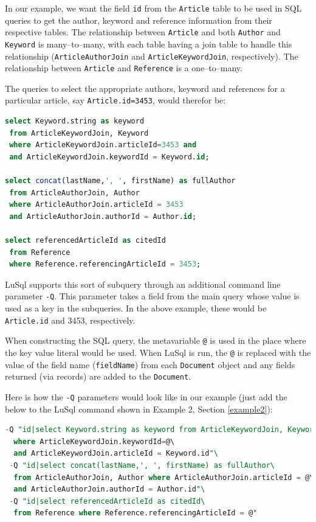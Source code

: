 In our example, we want the field {\tt id} from the {\tt Article} table to be used
in SQL queries to get the author, keyword and reference information from their
respective tables.
The relationship between {\tt Article} and both {\tt Author} and {\tt
  Keyword} is many--to--many, with each table having a join table to handle
this relationship ({\tt ArticleAuthorJoin} and {\tt ArticleKeywordJoin},
respectively). 
The relationship between {\tt Article} and {\tt Reference} is a one--to--many.

The queries to select the appropriate authors, keyword and references for a
particular article, say
{\tt Article.id=3453}, would therefor be:
\begin{lstlisting}[backgroundcolor=\color{grey},language=SQL]
select Keyword.string as keyword 
 from ArticleKeywordJoin, Keyword
 where ArticleKeywordJoin.articleId=3453 and
 and ArticleKeywordJoin.keywordId = Keyword.id;

select concat(lastName,', ', firstName) as fullAuthor 
 from ArticleAuthorJoin, Author
 where ArticleAuthorJoin.articleId = 3453 
 and ArticleAuthorJoin.authorId = Author.id;

select referencedArticleId as citedId 
 from Reference 
 where Reference.referencingArticleId = 3453;
\end{lstlisting}


LuSql supports this sort of subquery through an additional command line
parameter {\tt-Q}.
This parameter takes a field from the main query whose value is used as a key
in the subqueries.
In the above example, these would be {\tt Article.id} and 3453, respectively.

When constructing the SQL query, the metavariable {\tt @} is used in the
place where the key value literal would be used.
When LuSql is run, the {\tt @} is replaced with the value of the
field name ({\tt fieldName}) from each {\tt Document} object and any fields
returned (via records) are added to the {\tt Document}. 



Here is how the {\tt -Q} parameters would look like in our example (just add
the below to the LuSql command shown in Example 2, Section \ref{example2}):

\begin{lstlisting}[backgroundcolor=\color{grey},language=SQL]
 -Q "id|select Keyword.string as keyword from ArticleKeywordJoin, Keyword\
  where ArticleKeywordJoin.keywordId=@\ 
  and ArticleKeywordJoin.articleId = Keyword.id"\
 -Q "id|select concat(lastName,', ', firstName) as fullAuthor\
  from ArticleAuthorJoin, Author where ArticleAuthorJoin.articleId = @\
  and ArticleAuthorJoin.authorId = Author.id"\
 -Q "id|select referencedArticleId as citedId\
  from Reference where Reference.referencingArticleId = @"
\end{lstlisting}

